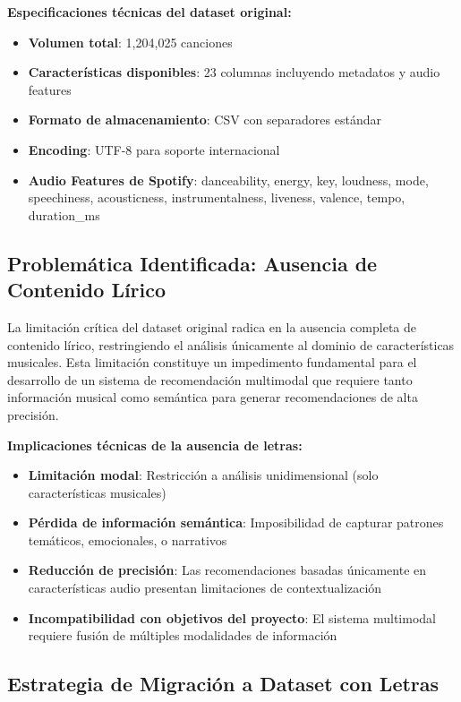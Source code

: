 \documentclass[12pt,a4paper]{report}
\begin{document}
\textbf{Especificaciones técnicas del dataset original:}
\begin{itemize}[leftmargin=*]
    \item \textbf{Volumen total}: 1,204,025 canciones
    \item \textbf{Características disponibles}: 23 columnas incluyendo metadatos y audio features
    \item \textbf{Formato de almacenamiento}: CSV con separadores estándar
    \item \textbf{Encoding}: UTF-8 para soporte internacional
    \item \textbf{Audio Features de Spotify}: danceability, energy, key, loudness, mode, speechiness, acousticness, instrumentalness, liveness, valence, tempo, duration\_ms
\end{itemize}

\subsection{Problemática Identificada: Ausencia de Contenido Lírico}

La limitación crítica del dataset original radica en la ausencia completa de contenido lírico, restringiendo el análisis únicamente al dominio de características musicales. Esta limitación constituye un impedimento fundamental para el desarrollo de un sistema de recomendación multimodal que requiere tanto información musical como semántica para generar recomendaciones de alta precisión.

\textbf{Implicaciones técnicas de la ausencia de letras:}
\begin{itemize}[leftmargin=*]
    \item \textbf{Limitación modal}: Restricción a análisis unidimensional (solo características musicales)
    \item \textbf{Pérdida de información semántica}: Imposibilidad de capturar patrones temáticos, emocionales, o narrativos
    \item \textbf{Reducción de precisión}: Las recomendaciones basadas únicamente en características audio presentan limitaciones de contextualización
    \item \textbf{Incompatibilidad con objetivos del proyecto}: El sistema multimodal requiere fusión de múltiples modalidades de información
\end{itemize}

\subsection{Estrategia de Migración a Dataset con Letras}
\end{document}
